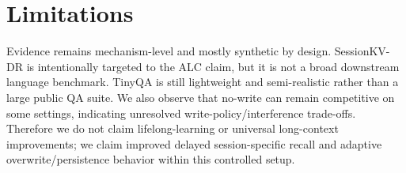 \section{Limitations}
Evidence remains mechanism-level and mostly synthetic by design. SessionKV-DR is intentionally targeted to the ALC claim, but it is not a broad downstream language benchmark. TinyQA is still lightweight and semi-realistic rather than a large public QA suite. We also observe that no-write can remain competitive on some settings, indicating unresolved write-policy/interference trade-offs. Therefore we do not claim lifelong-learning or universal long-context improvements; we claim improved delayed session-specific recall and adaptive overwrite/persistence behavior within this controlled setup.
